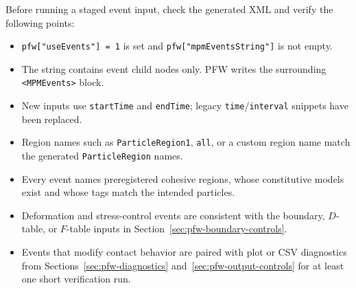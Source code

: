 Before running a staged event input, check the generated XML and verify the following points:
\begin{itemize}[leftmargin=*]
\item \texttt{pfw["useEvents"] = 1} is set and \texttt{pfw["mpmEventsString"]} is not empty.
\item The string contains event child nodes only.  PFW writes the surrounding \texttt{<MPMEvents>} block.
\item New inputs use \texttt{startTime} and \texttt{endTime}; legacy \texttt{time}/\texttt{interval} snippets have been replaced.
\item Region names such as \texttt{ParticleRegion1}, \texttt{all}, or a custom region name match the generated \texttt{ParticleRegion} names.
\item Every  event names preregistered cohesive regions, whose constitutive models exist and whose tags match the intended particles.
\item Deformation and stress-control events are consistent with the boundary, \(D\)-table, or \(F\)-table inputs in Section~\ref{sec:pfw-boundary-controls}.
\item Events that modify contact behavior are paired with plot or CSV diagnostics from Sections~\ref{sec:pfw-diagnostics} and~\ref{sec:pfw-output-controls} for at least one short verification run.
\end{itemize}
